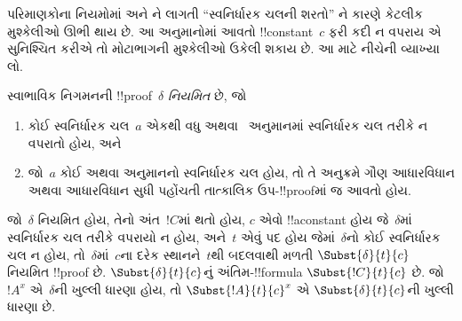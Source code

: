 \documentclass[../../../include/open-logic-section]{subfiles}
\begin{document}


પરિમાણકોના નિયમોમાં
\Elim{\lexists} અને
\Intro{\lforall}ને લાગતી
``સ્વનિર્ધારક ચલની શરતો''
ને કારણે કેટલીક મુશ્કેલીઓ
ઊભી થાય છે. આ અનુમાનોમાં
આવતો !!{constant}~$c$
ફરી કદી ન વપરાય એ
સુનિશ્ચિત કરીએ તો
મોટાભાગની મુશ્કેલીઓ
ઉકેલી શકાય છે.
આ માટે નીચેની વ્યાખ્યા લો.

\begin{defn}
સ્વાભાવિક નિગમનની
!!{proof}~$\delta$
\emph{નિયમિત} છે, જો
\begin{enumerate}
  \item કોઈ સ્વનિર્ધારક ચલ~$a$
  એકથી વધુ \Elim{\lexists}
  અથવા~\Intro{\lforall}
  અનુમાનમાં સ્વનિર્ધારક ચલ
  તરીકે ન વપરાતો હોય, અને
  \item જો~$a$ કોઈ
  \Elim{\lexists} અથવા
  \Intro{\lforall} અનુમાનનો
  સ્વનિર્ધારક ચલ હોય,
  તો તે અનુક્રમે ગૌણ
  આધારવિધાન અથવા આધારવિધાન
  સુધી પહોંચતી તાત્કાલિક
  ઉપ-!!{proof}માં જ આવતો હોય.
\end{enumerate}
\end{defn}

\begin{lem}
જો~$\delta$ નિયમિત હોય,
તેનો અંત~$!C$માં થતો હોય,
$c$ એવો !!a{constant} હોય
જે~$\delta$માં સ્વનિર્ધારક
ચલ તરીકે વપરાયો ન હોય,
અને~$t$ એવું પદ હોય
જેમાં~$\delta$નો કોઈ
સ્વનિર્ધારક ચલ ન હોય,
તો~$\delta$માં~$c$ના
દરેક સ્થાનને~$t$થી
બદલવાથી મળતી
$\Subst{\delta}{t}{c}$
નિયમિત !!{proof} છે.
$\Subst{\delta}{t}{c}$નું
અંતિમ-!!{formula}
$\Subst{!C}{t}{c}$ છે.
જો~$!A^x$ એ~$\delta$ની
ખુલ્લી ધારણા હોય, તો
$\Subst{!A}{t}{c}^x$ એ
$\Subst{\delta}{t}{c}$ની
ખુલ્લી ધારણા છે.
\end{lem}
\end{document}
